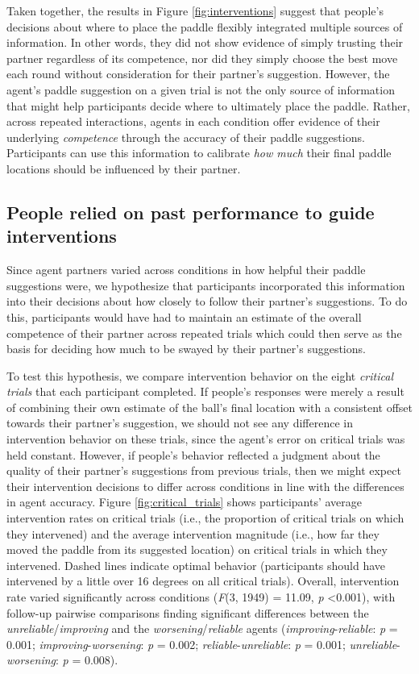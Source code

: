 \documentclass[10pt,letterpaper]{article}
\begin{document}
Taken together, the results in Figure \ref{fig:interventions} suggest that people's decisions about where to place the paddle flexibly integrated multiple sources of information. In other words, they did not show evidence of simply trusting their partner regardless of its competence, nor did they simply choose the best move each round without consideration for their partner's suggestion. However, the agent's paddle suggestion on a given trial is not the only source of information that might help participants decide where to ultimately place the paddle. Rather, across repeated interactions, agents in each condition offer evidence of their underlying \textit{competence} through the accuracy of their paddle suggestions. Participants can use this information to calibrate \textit{how much} their final paddle locations should be influenced by their partner. 


\subsection{People relied on past performance to guide interventions}

Since agent partners varied across conditions in how helpful their paddle suggestions were, we hypothesize that participants incorporated this information into their decisions about how closely to follow their partner's suggestions. To do this, participants would have had to maintain an estimate of the overall competence of their partner across repeated trials which could then serve as the basis for deciding how much to be swayed by their partner's suggestions. 

To test this hypothesis, we compare intervention behavior on the eight \textit{critical trials} that each participant completed. If people's responses were merely a result of combining their own estimate of the ball's final location with a consistent offset towards their partner's suggestion, we should not see any difference in intervention behavior on these trials, since the agent's error on critical trials was held constant. However, if people's behavior reflected a judgment about the quality of their partner's suggestions from previous trials, then we might expect their intervention decisions to differ across conditions in line with the differences in agent accuracy. Figure \ref{fig:critical_trials} shows participants' average intervention rates on critical trials (i.e., the proportion of critical trials on which they intervened) and the average intervention magnitude (i.e., how far they moved the paddle from its suggested location) on critical trials in which they intervened. Dashed lines indicate optimal behavior (participants should have intervened by a little over 16 degrees on all critical trials). Overall, intervention rate varied significantly across conditions (\textit{F}(3, 1949) = 11.09, \textit{p} \textless{0.001}), with follow-up pairwise comparisons finding significant differences between the \textit{unreliable}/\textit{improving} and the \textit{worsening}/\textit{reliable} agents (\textit{improving}-\textit{reliable}: \textit{p} = 0.001; \textit{improving}-\textit{worsening}: \textit{p} = 0.002; \textit{reliable}-\textit{unreliable}: \textit{p} = 0.001; \textit{unreliable}-\textit{worsening}: \textit{p} = 0.008). 
\end{document}
